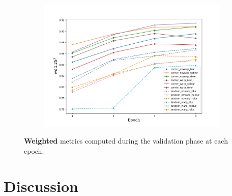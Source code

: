 \begin{figure}
\begin{adjustwidth}{-0.2\textwidth}{-0.2\textwidth}
        \begin{subfigure}{0.6\textwidth}
            \includegraphics[width=\textwidth]{figs/wa3}
        \end{subfigure}
    \end{adjustwidth}
    \caption{
        \textbf{Weighted} metrics computed during the validation phase at each epoch.
        \label{fig:Wvalidation}
    }
\end{figure}

\section{Discussion}
\label{sec:discussion}

